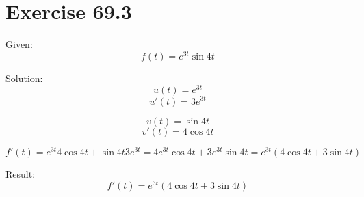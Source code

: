 \documentclass[a4paper, 10pt]{scrartcl}
\begin{document}
\section{Exercise 69.3}

Given:
\[f(t) = e^{3t}\sin{4t}\]

Solution:
\[u(t) = e^{3t}\]
\[u'(t) = 3e^{3t}\]

\[v(t) = \sin{4t}\]
\[v'(t) = 4\cos{4t}\]

\[f'(t) = e^{3t}4\cos{4t} + \sin{4t}3e^{3t} =
          4e^{3t}\cos{4t} + 3e^{3t}\sin{4t} =
          e^{3t}(4\cos{4t} + 3\sin{4t})\]

Result:
\[f'(t) = e^{3t}(4\cos{4t} + 3\sin{4t})\]
\end{document}
